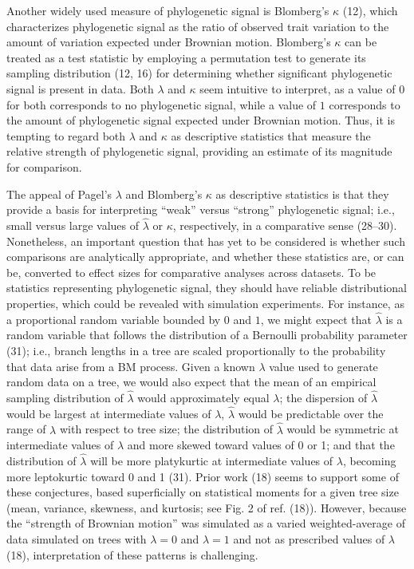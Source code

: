 \documentclass[9pt,twocolumn,twoside,lineno]{pnas-new}
\begin{document}
Another widely used measure of phylogenetic signal is Blomberg's
\(\kappa\) (12), which characterizes phylogenetic signal as the ratio of
observed trait variation to the amount of variation expected under
Brownian motion. Blomberg's \(\kappa\) can be treated as a test
statistic by employing a permutation test to generate its sampling
distribution (12, 16) for determining whether significant phylogenetic
signal is present in data. Both \(\lambda\) and \(\kappa\) seem
intuitive to interpret, as a value of \(0\) for both corresponds to no
phylogenetic signal, while a value of \(1\) corresponds to the amount of
phylogenetic signal expected under Brownian motion. Thus, it is tempting
to regard both \(\lambda\) and \(\kappa\) as descriptive statistics that
measure the relative strength of phylogenetic signal, providing an
estimate of its magnitude for comparison.

The appeal of Pagel's \(\lambda\) and Blomberg's \(\kappa\) as
descriptive statistics is that they provide a basis for interpreting
``weak'' versus ``strong'' phylogenetic signal; i.e., small versus large
values of \(\hat{\lambda}\) or \(\kappa\), respectively, in a
comparative sense (28--30). Nonetheless, an important question that has
yet to be considered is whether such comparisons are analytically
appropriate, and whether these statistics are, or can be, converted to
effect sizes for comparative analyses across datasets. To be statistics
representing phylogenetic signal, they should have reliable
distributional properties, which could be revealed with simulation
experiments. For instance, as a proportional random variable bounded by
\(0\) and \(1\), we might expect that \(\hat{\lambda}\) is a random
variable that follows the distribution of a Bernoulli probability
parameter (31); i.e., branch lengths in a tree are scaled proportionally
to the probability that data arise from a BM process. Given a known
\(\lambda\) value used to generate random data on a tree, we would also
expect that the mean of an empirical sampling distribution of
\(\hat{\lambda}\) would approximately equal \(\lambda\); the dispersion
of \(\hat{\lambda}\) would be largest at intermediate values of
\(\lambda\), \(\hat{\lambda}\) would be predictable over the range of
\(\lambda\) with respect to tree size; the distribution of
\(\hat{\lambda}\) would be symmetric at intermediate values of
\(\lambda\) and more skewed toward values of 0 or 1; and that the
distribution of \(\hat{\lambda}\) will be more platykurtic at
intermediate values of \(\lambda\), becoming more leptokurtic toward 0
and 1 (31). Prior work (18) seems to support some of these conjectures,
based superficially on statistical moments for a given tree size (mean,
variance, skewness, and kurtosis; see Fig. 2 of ref. (18)). However,
because the ``strength of Brownian motion'' was simulated as a varied
weighted-average of data simulated on trees with \(\lambda=0\) and
\(\lambda=1\) and not as prescribed values of \(\lambda\) (18),
interpretation of these patterns is challenging.
\end{document}
